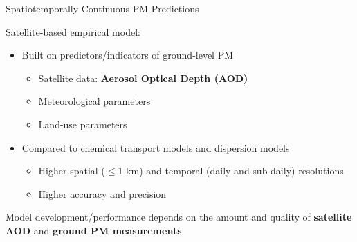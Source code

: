 \begin{frame}{Spatiotemporally Continuous PM Predictions}

Satellite-based empirical model:
\vspace{-0.5cm}
\begin{center}
    \footnotesize
\end{center}

\begin{itemize}
    \item Built on predictors/indicators of ground-level PM
    \begin{itemize}
        \item Satellite data: \textbf{Aerosol Optical Depth (AOD)}
        \item Meteorological parameters
        \item Land-use parameters
    \end{itemize}
    \item Compared to chemical transport models and dispersion models
    \begin{itemize}
        \item Higher spatial ($\leq$1 km) and temporal (daily and sub-daily) resolutions
        \item Higher accuracy and precision
    \end{itemize}
\end{itemize}
\begin{center}
    \color{red} Model development/performance depends on the amount and quality of \textbf{satellite AOD} and \textbf{ground PM measurements}
\end{center}
\end{frame}

